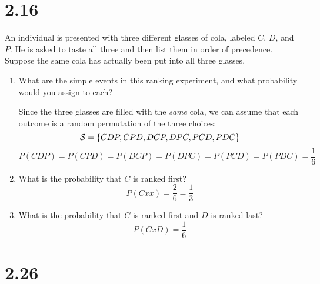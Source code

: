 \documentclass[letterpaper,12pt,fleqn]{article}
\renewcommand{\S}{\mathcal{S}}
\begin{document}
\bigskip

\section*{2.16}

An individual is presented with three different glasses of cola, labeled \(C\), \(D\), and \(P\).  He is asked to taste all
three and then list them in order of precedence.  Suppose the same cola has actually been put into all three glasses.
\begin{enumerate}[label=\alph*)]
\item What are the simple events in this ranking experiment, and what probability would you assign to each?

  Since the three glasses are filled with the \emph{same} cola, we can assume that each outcome is a random permutation of
  the three choices:
  \[\S=\set{CDP,CPD,DCP,DPC,PCD,PDC}\]
  \[P(CDP)=P(CPD)=P(DCP)=P(DPC)=P(PCD)=P(PDC)=\frac{1}{6}\]

\item What is the probability that \(C\) is ranked first?
  \[P(Cxx)=\frac{2}{6}=\frac{1}{3}\]

\item What is the probability that \(C\) is ranked first and \(D\) is ranked last?
  \[P(CxD)=\frac{1}{6}\]
\end{enumerate}

\bigskip

\section*{2.26}
\end{document}
